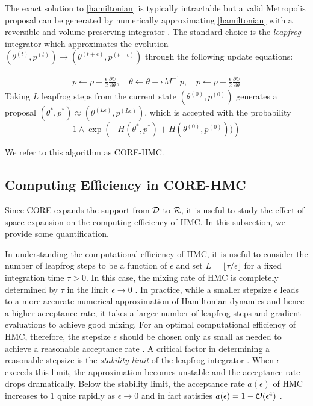 \documentclass[10pt,fleqn]{article} \pdfoutput=1
\DeclareMathOperator{\1}{\mathbbm{1}} \DeclareMathOperator{\bigO}{\mc O}
\newcommand{\dt}{\epsilon} %
\newcommand{\mass}{M} %
\begin{document}
The exact solution to \eqref{hamiltonian} is typically intractable but a
valid Metropolis proposal can be generated by numerically approximating
\eqref{hamiltonian} with a reversible and volume-preserving  integrator
\citep{neal2011mcmc}. The standard choice is the \textit{leapfrog}
integrator which approximates the evolution $(\theta^{(t)},p^{(t)}) \to (\theta^{(t +
\dt)},p^{(t + \dt)})$ through the following update equations:

\begin{equation} \begin{aligned} \label{leap-frog}
p \leftarrow p -
\frac{\dt}{2} \frac{\partial U}{\partial  \theta },\quad \theta \leftarrow  \theta
+ \dt \mass^{-1}p,\quad p \leftarrow p -  \frac{\dt}{2}
\frac{\partial U}{\partial  \theta }\end{aligned} \end{equation} Taking
$L$ leapfrog steps from the current state $(\theta^{(0)},p^{(0)})$
generates a proposal $(\theta^{*},p^{*}) \approx (\theta^{(L \dt)},p^{(L
\dt)})$, which is accepted with the probability $$1\wedge \exp
\left( - H(\theta^{*},p^{*}) + H(\theta^{(0)},p^{(0)}))\right)$$

We refer to this algorithm as CORE-HMC.

\subsection{Computing Efficiency in CORE-HMC}

Since CORE expands the support from $\mathcal{D}$ to $\mathcal{R}$, it is useful to
study the effect of space expansion on the computing efficiency of HMC. In this
subsection, we provide some quantification.

In understanding the computational efficiency of HMC, it is useful to
consider the number of leapfrog steps to be a function of $\dt$ and set $L
= \lfloor \tau / \dt \rfloor$ for a fixed integration time $\tau > 0$. In
this case, the mixing rate of HMC is completely determined by $\tau$ in the
limit $\dt \to 0$ \citep{betancourt17}. In practice, while a smaller
stepsize $\dt$ leads to a more accurate numerical approximation of
Hamiltonian dynamics and hence a higher acceptance rate, it takes a larger
number of leapfrog steps and gradient evaluations to achieve good mixing.
For an optimal computational efficiency of HMC, therefore, the stepsize
$\dt$ should be chosen only as small as needed to achieve a reasonable
acceptance rate \citep{beskos13, betancourt14}. A critical factor in
determining a reasonable stepsize is the \textit{stability limit} of the
leapfrog integrator \citep{neal2011mcmc}. When $\dt$ exceeds this limit,
the approximation becomes unstable and the acceptance rate drops
dramatically. Below the stability limit, the acceptance rate $a(\dt)$ of
HMC increases to 1 quite rapidly as $\dt \to 0$ and in fact satisfies
$a(\dt) = 1 - \mc O(\dt^4)$ \citep{beskos13}.
\end{document}
